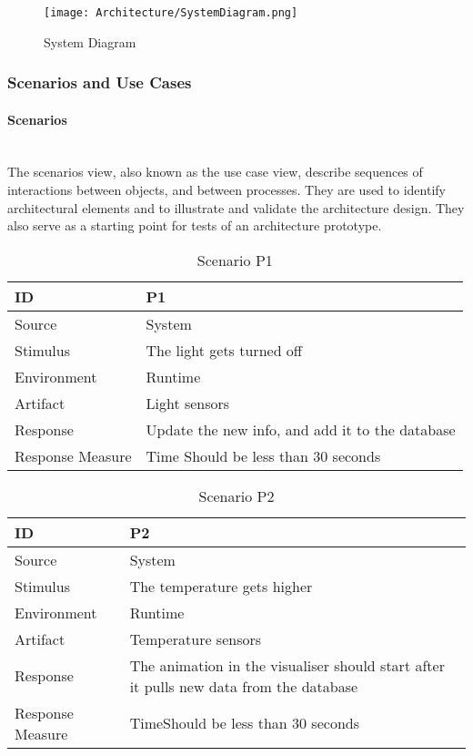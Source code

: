 \documentclass[../document.tex]{subfiles}
\begin{document}
\begin{figure}[H]
	\centering
	\texttt{[image: Architecture/SystemDiagram.png]}
	\caption{System Diagram}
\end{figure}

\subsubsection{Scenarios and Use Cases}
\paragraph{Scenarios} \ \\
The scenarios view, also known as the use case view, describe sequences of interactions between objects, and between processes. They are used to identify architectural elements and to illustrate and validate the architecture design. They also serve as a starting point for tests of an architecture prototype.

\begin{table}[H]
	\caption{Scenario P1}
	\begin{tabularx}{\textwidth}{|X|X|}
		\hline
		ID					& P1 \\ \hline
		Source				& System \\ \hline
		Stimulus			& The light gets turned off \\ \hline
		Environment			& Runtime \\ \hline
		Artifact			& Light sensors \\ \hline
		Response			& Update the new info, and add it to the database \\ \hline
		Response Measure	& Time \newline Should be less than 30 seconds
		\\ \hline
	\end{tabularx}
\end{table}

\begin{table}[H]
	\caption{Scenario P2}
	\begin{tabularx}{\textwidth}{|X|X|}
		\hline
		ID					& P2 \\ \hline
		Source				& System \\ \hline
		Stimulus			& The temperature gets higher \\ \hline
		Environment			& Runtime \\ \hline
		Artifact			& Temperature sensors \\ \hline
		Response			& The animation in the visualiser should start after it pulls new data from the database \\ \hline
		Response Measure	& Time\newline Should be less than 30 seconds
		\\ \hline
	\end{tabularx}
\end{table}
\end{document}
